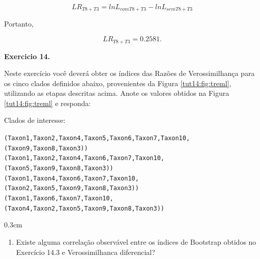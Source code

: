\begin{refsection}
\begin{center}
\begin{equation}
LR_{T8+T3} = lnL_{com T8+T3} - lnL_{sem T8+T3}
\end{equation}
\end{center}

Portanto,


\begin{center}
\begin{equation}
LR_{T8+T3} = 0.2581.
\end{equation}
\end{center}

\vspace{50pt}

\begin{blackBlock}{\textbf{Exercicio 14.}}\label{tut14:ex:14.5}

Neste exercício você deverá obter os índices das Razões de Verossimilhança para os cinco clados definidos abaixo, provenientes da Figura \ref{tut14:fig:treml}, utilizando as etapas descritas acima. Anote os valores obtidos na Figura \ref{tut14:fig:treml} e responda:

\end{blackBlock}

\vspace{50pt}

Clados de interesse:

\begin{center}

\scriptsize\texttt{(Taxon1,Taxon2,Taxon4,Taxon5,Taxon6,Taxon7,Taxon10,(Taxon9,Taxon8,Taxon3))}\\
\scriptsize\texttt{(Taxon1,Taxon2,Taxon4,Taxon6,Taxon7,Taxon10,(Taxon5,Taxon9,Taxon8,Taxon3))}\\
\scriptsize\texttt{(Taxon1,Taxon4,Taxon6,Taxon7,Taxon10,(Taxon2,Taxon5,Taxon9,Taxon8,Taxon3))}\\
\scriptsize\texttt{(Taxon1,Taxon6,Taxon7,Taxon10,(Taxon4,Taxon2,Taxon5,Taxon9,Taxon8,Taxon3))}\\

\end{center}


\begin {myindentpar}{0.3cm}
\begin{enumerate}[\itshape i.]

	\item{Existe alguma correlação observável entre os índices de Bootstrap obtidos no Exercício 14.3 e Verossimilhanca diferencial?}


\end{enumerate}
\end{myindentpar}
\end{refsection}
